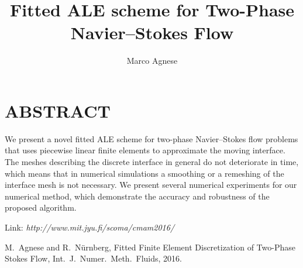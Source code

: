 \documentclass{article}
\title{Fitted ALE scheme for Two-Phase Navier--Stokes Flow}
\author{Marco Agnese}
\begin{document}
\maketitle

\section*{ABSTRACT}


We present a novel fitted ALE scheme for two-phase Navier--Stokes flow problems
that uses piecewise linear finite elements to approximate the moving interface.
The meshes describing the discrete interface in general do not deteriorate in
time, which means that in numerical simulations a smoothing or a remeshing of
the interface mesh is not necessary. We present several numerical experiments
for our numerical method, which demonstrate the accuracy and
robustness of the proposed algorithm.

Link: \emph{http://www.mit.jyu.fi/scoma/cmam2016/}

\begin{thebibliography}{99}
M.~Agnese and R.~N\"urnberg, Fitted Finite Element Discretization of Two-Phase
{S}tokes Flow, Int.\ J.\ Numer.\ Meth.\ Fluids, 2016.

\end{thebibliography}
\end{document}
